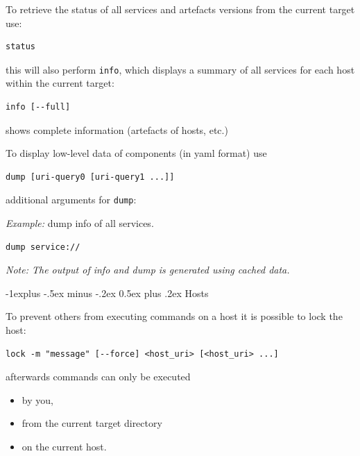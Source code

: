 \documentclass[10pt,landscape]{article}
\makeatletter
\renewcommand{\subsection}{\@startsection{subsection}{2}{0mm}%
                                {-1explus -.5ex minus -.2ex}%
                                {0.5ex plus .2ex}%
                                {\normalfont\normalsize\bfseries}}
\makeatother
\begin{document}
\begin{multicols}{3}
To retrieve the status of all services and artefacts versions from the current
target use:
\begin{lstlisting}
status
\end{lstlisting}

this will also perform \verb+info+, which displays a summary of all
services for each host within the current target:
\begin{lstlisting}
info [--full]
\end{lstlisting}

\begin{description}[font=\bfseries,leftmargin=1.5cm,style=sameline]
    \item [--full]     shows complete information (artefacts of hosts, etc.)
\end{description}

To display low-level data of components (in yaml format) use
\begin{lstlisting}
dump [uri-query0 [uri-query1 ...]]
\end{lstlisting}

additional arguments for \verb+dump+:
\begin{description}[font=\bfseries,leftmargin=1.5cm,style=sameline]
    \item [--attribute]
    \item [--show-pending-updates]
    \item [--show-current-artefacts]
\end{description}

\emph{Example:} dump info of all services.
\begin{lstlisting}
dump service://
\end{lstlisting}

\emph{Note: The output of info and dump is generated using cached data.}



\vfill\columnbreak
\subsection{Hosts}

To prevent others from executing commands on a host it is possible to lock the host:
\begin{lstlisting}
lock -m "message" [--force] <host_uri> [<host_uri> ...]
\end{lstlisting}

afterwards commands can only be executed
\begin{itemize}
\item by you,
\item from the current target directory
\item on the current host.
\end{itemize}


\end{multicols}
\end{document}
